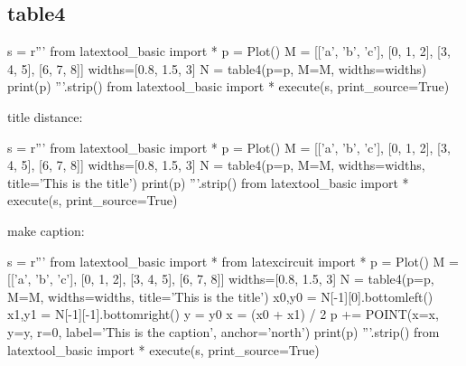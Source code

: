 \subsection{table4}

\begin{python}
s = r'''
from latextool_basic import *
p = Plot()
M = [['a', 'b', 'c'],
     [0, 1, 2],
     [3, 4, 5],
     [6, 7, 8]]
widths=[0.8, 1.5, 3]
N = table4(p=p, M=M, widths=widths)
print(p)
'''.strip()
from latextool_basic import *
execute(s, print_source=True)
\end{python}

\newpage
title distance:
\begin{python}
s = r'''
from latextool_basic import *
p = Plot()
M = [['a', 'b', 'c'],
     [0, 1, 2],
     [3, 4, 5],
     [6, 7, 8]]
widths=[0.8, 1.5, 3]
N = table4(p=p, M=M, widths=widths, title='This is the title')
print(p)
'''.strip()
from latextool_basic import *
execute(s, print_source=True)
\end{python}


\newpage
make caption:
\begin{python}
s = r'''
from latextool_basic import *
from latexcircuit import *
p = Plot()
M = [['a', 'b', 'c'],
     [0, 1, 2],
     [3, 4, 5],
     [6, 7, 8]]
widths=[0.8, 1.5, 3]
N = table4(p=p, M=M, widths=widths, title='This is the title')
x0,y0 = N[-1][0].bottomleft()
x1,y1 = N[-1][-1].bottomright()
y = y0
x = (x0 + x1) / 2
p += POINT(x=x, y=y, r=0, label='This is the caption', anchor='north')
print(p)
'''.strip()
from latextool_basic import *
execute(s, print_source=True)
\end{python}


